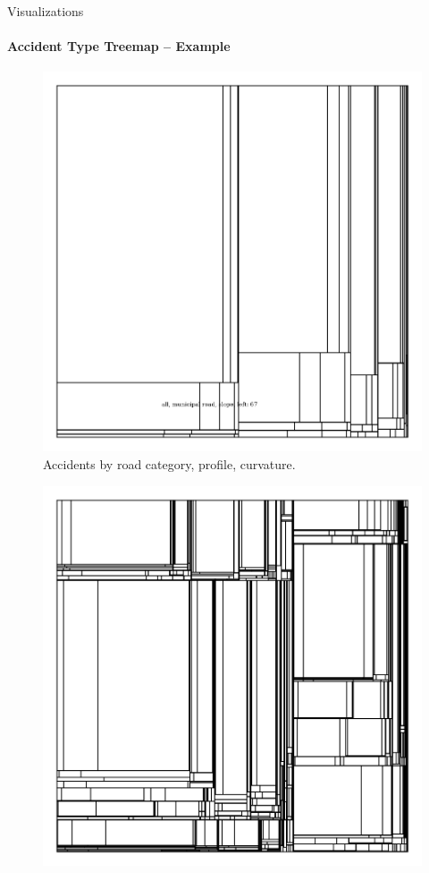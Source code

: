 \documentclass[english]{mlutalk}
\begin{document}
\begin{frame}{Visualizations}
  \framesubtitle{Accident Type Treemap -- Example}
  \begin{minipage}{0.49\linewidth}
    \begin{figure}
      \centering
      \includegraphics[width=1\linewidth]{../report/figures/tree-treemap-road-category-road-profile-road-curvature}
      \caption{Accidents by road category, profile, curvature.}
    \end{figure}
  \end{minipage}
  \begin{minipage}{0.49\linewidth}
    \begin{figure}
      \centering
      \includegraphics[width=1\linewidth]{../report/figures/tree-treemap-location-type-traffic-regime-intersection-type-road-curvature-road-profile-dedicated-line-road-category}

\end{figure}
\end{minipage}
\end{frame}
\end{document}
